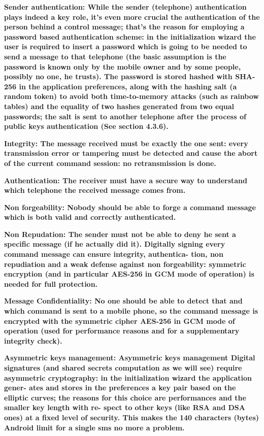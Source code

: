 \bfseries 
Sender authentication:
\normalfont
While the sender (telephone) authentication plays indeed a key role, it’s even
more crucial the authentication of the person behind a control message; that’s
the reason for employing a password based authentication scheme: in the
initialization wizard the user is required to insert a password which is going
to be needed to send a message to that telephone (the basic assumption
is the password is known only by the mobile owner and by some people,
possibly no one, he trusts). The password is stored hashed with SHA-256 in
the application preferences, along with the hashing salt (a random token) to
avoid both time-to-memory attacks (such as rainbow tables) and the equality
of two hashes generated from two equal passwords; the salt is sent to another
telephone after the process of public keys authentication (See section 4.3.6).


\bfseries 
Integrity:
\normalfont
The message received must be exactly the one sent: every transmission error
or tampering must be detected and cause the abort of the current command
session: no retransmission is done.


\bfseries
Authentication:
\normalfont
The receiver must have a secure way to understand which telephone the
received message comes from.


\bfseries 
Non forgeability:
\normalfont
Nobody should be able to forge a command message which is both valid and
correctly authenticated.


\bfseries 
Non Repudation:
\normalfont
The sender must not be able to deny he sent a specific message (if he actually
did it).
Digitally signing every command message can ensure integrity, authentica-
tion, non repudiation and a weak defense against non forgeability: symmetric
encryption (and in particular AES-256 in GCM mode of operation) is needed
for full protection.


\bfseries
Message Confidentiality:
\normalfont
No one should be able to detect that and which command is sent to a mobile
phone, so the command message is encrypted with the symmetric cipher
AES-256 in GCM mode of operation (used for performance reasons and for a
supplementary integrity check).



\bfseries
Asymmetric keys management:
\normalfont
Asymmetric keys management
Digital signatures (and shared secrets computation as we will see) require
asymmetric cryptography: in the initialization wizard the application gener-
ates and stores in the preferences a key pair based on the elliptic curves; the
reasons for this choice are performances and the smaller key length with re-
spect to other keys (like RSA and DSA ones) at a fixed level of security. This
makes the 140 characters (bytes) Android limit for a single sms no more a
problem.


